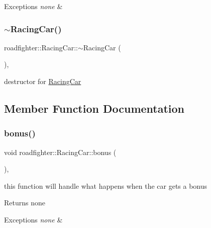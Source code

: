\begin{DoxyExceptions}{Exceptions}
{\em none} & \\
\hline
\end{DoxyExceptions}
\mbox{\label{classroadfighter_1_1RacingCar_a1ae41bc99dca96cde8187f4ba2172ea7}} 
\subsubsection{\texorpdfstring{$\sim$\+Racing\+Car()}{~RacingCar()}}
{\footnotesize\ttfamily roadfighter\+::\+Racing\+Car\+::$\sim$\+Racing\+Car (\begin{DoxyParamCaption}{ }\end{DoxyParamCaption})\hspace{0.3cm}{\ttfamily [override]}, {\ttfamily [default]}}

destructor for \hyperlink{classroadfighter_1_1RacingCar}{Racing\+Car} 

\subsection{Member Function Documentation}
\mbox{\label{classroadfighter_1_1RacingCar_a5858dd3f2c7bb49782b29c0a90846a6c}} 
\subsubsection{\texorpdfstring{bonus()}{bonus()}}
{\footnotesize\ttfamily void roadfighter\+::\+Racing\+Car\+::bonus (\begin{DoxyParamCaption}{ }\end{DoxyParamCaption})\hspace{0.3cm}{\ttfamily [override]}, {\ttfamily [virtual]}}

this function will handle what happens when the car gets a bonus \begin{DoxyReturn}{Returns}
none 
\end{DoxyReturn}

\begin{DoxyExceptions}{Exceptions}
{\em none} & \\
\hline
\end{DoxyExceptions}


